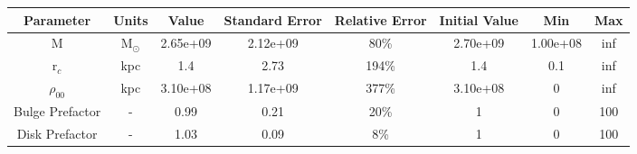 \begin{tabular}[c]{| c | c | c | c | c | c | c | c |} 
\hline 
    \textbf{Parameter} & \textbf{Units} & \textbf{Value} & \textbf{Standard Error} & \textbf{Relative Error} & \textbf{Initial Value} & \textbf{Min} & \textbf{Max} \\ \hline 
    M & M$_\odot$ & 2.65e+09 & 2.12e+09 & 80\% & 2.70e+09 & 1.00e+08 & inf \\ \hline 
    r$_c$ & kpc & 1.4 & 2.73 & 194\% & 1.4 & 0.1 & inf \\ \hline 
    $\rho_{00}$ & kpc & 3.10e+08 & 1.17e+09 & 377\% & 3.10e+08 & 0 & inf \\ \hline 
    Bulge Prefactor & - & 0.99 & 0.21 & 20\% & 1 & 0 & 100 \\ \hline 
    Disk Prefactor & - & 1.03 & 0.09 & 8\% & 1 & 0 & 100 \\ \hline 
\end{tabular} 
